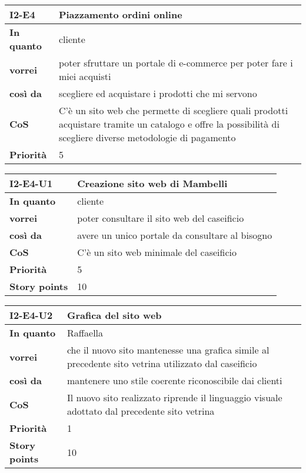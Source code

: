 \begin{table}[H]
  \begin{tabularx}{\textwidth}{lX}
    \toprule
    \textbf{I2-E4} & \textbf{Piazzamento ordini online} \\
    \midrule
    \textbf{In quanto} & cliente \\
    \textbf{vorrei} & poter sfruttare un portale di e-commerce per poter fare i miei acquisti \\
    \textbf{così da} & scegliere ed acquistare i prodotti che mi servono \\
    \midrule
    \textbf{CoS} & C'è un sito web che permette di scegliere quali prodotti acquistare tramite un catalogo e offre la possibilità di scegliere diverse metodologie di pagamento \\
    \midrule
    \textbf{Priorità} & 5 \\
    \bottomrule
  \end{tabularx}
  \label{user-story:i2-e4}
\end{table}

\begin{table}[H]
  \begin{tabularx}{\textwidth}{lX}
    \toprule
    \textbf{I2-E4-U1} & \textbf{Creazione sito web di Mambelli} \\
    \midrule
    \textbf{In quanto} & cliente \\
    \textbf{vorrei} & poter consultare il sito web del caseificio \\
    \textbf{così da} & avere un unico portale da consultare al bisogno \\
    \midrule
    \textbf{CoS} & C'è un sito web minimale del caseificio \\ 
    \midrule
    \textbf{Priorità} & 5 \\
    \textbf{Story points} & 10 \\
    \bottomrule
  \end{tabularx}
  \label{user-story:i2-e4-u1}
\end{table}

\begin{table}[H]
  \begin{tabularx}{\textwidth}{lX}
    \toprule
    \textbf{I2-E4-U2} & \textbf{Grafica del sito web} \\
    \midrule
    \textbf{In quanto} & Raffaella \\
    \textbf{vorrei} & che il nuovo sito mantenesse una grafica simile al precedente sito vetrina utilizzato dal caseificio \\
    \textbf{così da} & mantenere uno stile coerente riconoscibile dai clienti \\
    \midrule
    \textbf{CoS} & Il nuovo sito realizzato riprende il linguaggio visuale adottato dal precedente sito vetrina \\ 
    \midrule
    \textbf{Priorità} & 1 \\
    \textbf{Story points} & 10 \\
    \bottomrule
  \end{tabularx}
  \label{user-story:i2-e4-u2}
\end{table}


